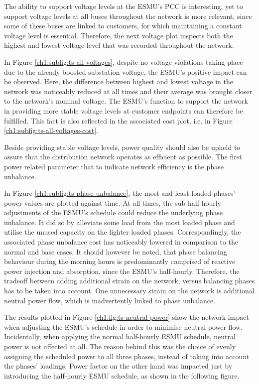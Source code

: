 The ability to support voltage levels at the ESMU's PCC is interesting, yet to support voltage levels at all buses throughout the network is more relevant, since some of these buses are linked to customers, for which maintaining a constant voltage level is essential.
Therefore, the next voltage plot inspects both the highest and lowest voltage level that was recorded throughout the network.



In Figure \ref{ch1:subfig:ts-all-voltages}, despite no voltage violations taking place due to the already boosted substation voltage, the ESMU's positive impact can be observed.
Here, the difference between highest and lowest voltage in the network was noticeably reduced at all times and their average was brought closer to the network's nominal voltage.
The ESMU's function to support the network in providing more stable voltage levels at customer endpoints can therefore be fulfilled.
This fact is also reflected in the associated cost plot, i.e. in Figure \ref{ch1:subfig:ts-all-voltages-cost}.

Beside providing stable voltage levels, power quality should also be upheld to assure that the distribution network operates as efficient as possible.
The first power related parameter that to indicate network efficiency is the phase unbalance.



In Figure \ref{ch1:subfig:ts-phase-unbalance}, the most and least loaded phases' power values are plotted against time.
At all times, the sub-half-hourly adjustments of the ESMU's schedule could reduce the underlying phase imbalance.
It did so by alleviate some load from the most loaded phase and utilise the unused capacity on the lighter loaded phases.
Correspondingly, the associated phase unbalance cost has noticeably lowered in comparison to the normal and base cases.
It should however be noted, that phase balancing behaviour during the morning hours is predominantly comprised of reactive power injection and absorption, since the ESMU's half-hourly.
Therefore, the tradeoff between adding additional strain on the network, versus balancing phases has to be taken into account.
One unnecessary strain on the network is additional neutral power flow, which is inadvertently linked to phase unbalance.



The results plotted in Figure \ref{ch1:fig:ts-neutral-power} show the network impact when adjusting the ESMU's schedule in order to minimise neutral power flow.
Incidentally, when applying the normal half-hourly ESMU schedule, neutral power is not affected at all.
The reason behind this was the choice of evenly assigning the scheduled power to all three phases, instead of taking into account the phases' loadings.
Power factor on the other hand was impacted just by introducing the half-hourly ESMU schedule, as shown in the following figure.

